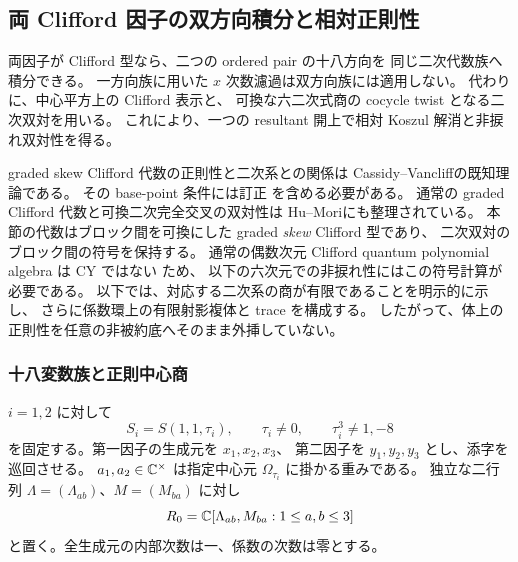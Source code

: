 \subsection{両 Clifford 因子の双方向積分と相対正則性}
\label{ifb:subsec:bidirectional}

両因子が Clifford 型なら、二つの ordered pair の十八方向を
同じ二次代数族へ積分できる。
一方向族に用いた $x$ 次数濾過は双方向族には適用しない。
代わりに、中心平方上の Clifford 表示と、
可換な六二次式商の cocycle twist となる二次双対を用いる。
これにより、一つの resultant 開上で相対 Koszul 解消と非捩れ双対性を得る。

graded skew Clifford 代数の正則性と二次系との関係は
Cassidy--Vancliff\cite[Theorem~4.2 and its proof]{IFBCassidyVancliff}の既知理論である。
その base-point 条件には訂正
\cite[Proposition~10, Corollary~11]{IFBCassidyVancliffCorr}を含める必要がある。
通常の graded Clifford 代数と可換二次完全交叉の双対性は
Hu--Mori\cite[Theorems~3.21, 3.28]{IFBHuMori}にも整理されている。
本節の代数はブロック間を可換にした graded \emph{skew} Clifford 型であり、
二次双対のブロック間の符号を保持する。
通常の偶数次元 Clifford quantum polynomial algebra は CY ではない
\cite[Corollary~3.13]{IFBHuMori}ため、
以下の六次元での非捩れ性にはこの符号計算が必要である。
以下では、対応する二次系の商が有限であることを明示的に示し、
さらに係数環上の有限射影複体と trace を構成する。
したがって、体上の正則性を任意の非被約底へそのまま外挿していない。

\subsubsection{十八変数族と正則中心商}

$i=1,2$ に対して
\[
 S_i=S(1,1,\tau_i),\qquad
 \tau_i\ne0,\qquad \tau_i^3\ne1,-8
\]
を固定する。第一因子の生成元を $x_1,x_2,x_3$、
第二因子を $y_1,y_2,y_3$ とし、添字を巡回させる。
$a_1,a_2\in\mathbb C^\times$ は指定中心元 $\Omega_{\tau_i}$ に掛かる重みである。
独立な二行列 $\Lambda=(\Lambda_{ab})$、$M=(M_{ba})$ に対し
\[
 R_0=\mathbb C[\Lambda_{ab},M_{ba}:1\le a,b\le3]
\]
と置く。全生成元の内部次数は一、係数の次数は零とする。

